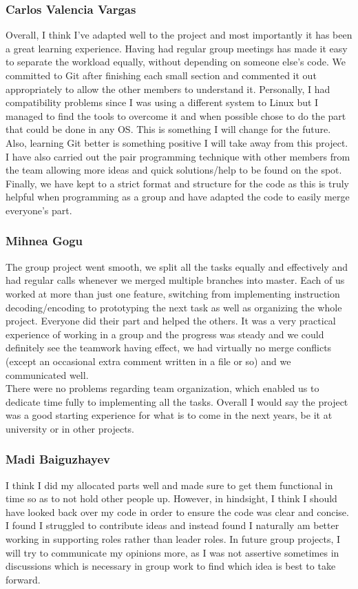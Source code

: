\documentclass[11pt]{article}
\begin{document}
\subsubsection{Carlos Valencia Vargas}
Overall, I think I’ve adapted well to the project and most importantly it has been a great learning experience. Having had regular group meetings has made it easy to separate the workload equally, without depending on someone else’s code. We committed to Git after finishing each small section and commented it out appropriately to allow the other members to understand it. Personally, I had compatibility problems since I was using a different system to Linux but I managed to find the tools to overcome it and when possible chose to do the part that could be done in any OS. This is something I will change for the future. Also, learning Git better is something positive I will take away from this project. I have also carried out the pair programming technique with other members from the team allowing more ideas and quick solutions/help to be found on the spot. Finally, we have kept to a strict format and structure for the code as this is truly helpful when programming as a group and have adapted the code to easily merge everyone's part.

\subsubsection{Mihnea Gogu}
The group project went smooth, we split all the tasks equally and effectively and had regular calls whenever we merged multiple branches into master. Each of us worked at more than just one feature, switching from implementing instruction decoding/encoding to prototyping the next task as well as organizing the whole project. Everyone did their part and helped the others. It was a very practical experience of working in a group and the progress was steady and we could definitely see the teamwork having effect, we had virtually no merge conflicts (except an occasional extra comment written in a file or so) and we communicated well.\\
There were no problems regarding team organization, which enabled us to dedicate time fully to implementing all the tasks. Overall I would say the project was a good starting experience for what is to come in the next years, be it at university or in other projects.

\subsubsection{Madi Baiguzhayev}
I think I did my allocated parts well and made sure to get them functional in time so as to not hold other people up. However, in hindsight, I think I should have looked back over my code in order to ensure the code was clear and concise. I found I struggled to contribute ideas and instead found I naturally am better working in supporting roles rather than leader roles. In future group projects, I will try to communicate my opinions more, as I was not assertive sometimes in discussions which is necessary in group work to find which idea is best to take forward. 
\end{document}

